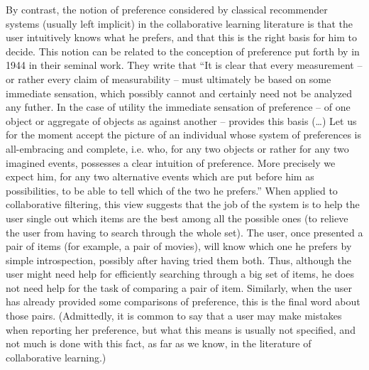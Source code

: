 \documentclass[french, english]{da2pl2018}
\begin{document}
By contrast, the notion of preference considered by classical recommender systems (usually left implicit) in the collaborative learning literature is that the user intuitively knows what he prefers, and that this is the right basis for him to decide. This notion can be related to the conception of preference put forth by \citet{von_neumann_theory_2004} in 1944 in their seminal work. They write that “It is clear that every measurement – or rather every claim of measurability – must ultimately be based on some immediate sensation, which possibly cannot and certainly need not be analyzed any futher. In the case of utility the immediate sensation of preference – of one object or aggregate of objects as against another – provides this basis (…) Let us for the moment accept the picture of an individual whose system of preferences is all-embracing and complete, i.e. who, for any two objects or rather for any two imagined events, possesses a clear intuition of preference. More precisely we expect him, for any two alternative events which are put before him as possibilities, to be able to tell which of the two he prefers.” When applied to collaborative filtering, this view suggests that the job of the system is to help the user single out which items are the best among all the possible ones (to relieve the user from having to search through the whole set). The user, once presented a pair of items (for example, a pair of movies), will know which one he prefers by simple introspection, possibly after having tried them both. Thus, although the user might need help for efficiently searching through a big set of items, he does not need help for the task of comparing a pair of item. Similarly, when the user has already provided some comparisons of preference, this is the final word about those pairs. (Admittedly, it is common to say that a user may make mistakes when reporting her preference, but what this means is usually not specified, and not much is done with this fact, as far as we know, in the literature of collaborative learning.)
\end{document}
